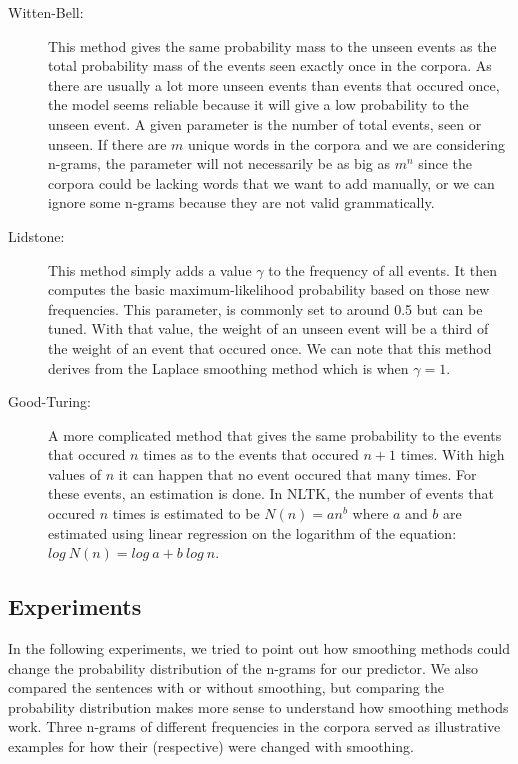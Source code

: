 \documentclass[a4paper,12pt]{article}
\begin{document}
	\begin{description}
		\item[Witten-Bell:] This method gives the same probability mass to the unseen events as the total probability mass of the events seen exactly once in the corpora. As there are usually a lot more unseen events than events that occured once, the model seems reliable because it will give a low probability to the unseen event. A given parameter is the number of total events, seen or unseen. If there are $m$ unique words in the corpora and we are considering n-grams, the parameter will not necessarily be as big as $m^n$ since the corpora could be lacking words that we want to add manually, or we can ignore some n-grams because they are not valid grammatically.
		\item[Lidstone:] This method simply adds a value $\gamma$ to the frequency of all events. It then computes the basic maximum-likelihood probability based on those new frequencies. This parameter, is commonly set to around 0.5 but can be tuned. With that value, the weight of an unseen event will be a third of the weight of an event that occured once. We can note that this method derives from the Laplace smoothing method which is when $\gamma = 1$.
		\item[Good-Turing:] A more complicated method that gives the same probability to the events that occured $n$ times as to the events that occured $n+1$ times. With high values of $n$ it can happen that no event occured that many times. For these events, an estimation is done. In NLTK, the number of events that occured $n$ times is estimated to be $N(n) = an^b$ where $a$ and $b$ are estimated using linear regression on the logarithm of the equation: $log\ N(n) = log\ a + b\ log\ n$.
	\end{description}
	
	\subsection{Experiments}
	
	In the following experiments, we tried to point out how smoothing methods could change the probability distribution of the n-grams for our predictor. We also compared the sentences with or without smoothing, but comparing the probability distribution makes more sense to understand how smoothing methods work. Three n-grams of different frequencies in the corpora served as illustrative examples for how their (respective) were changed with smoothing.
	
\end{document}
